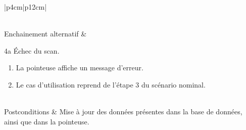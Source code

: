 \begin{longtable}{|p{4cm}|p{12cm}|}
\begin{minipage}[t]{\linewidth}
\begin{enumerate}[itemindent=0pt, leftmargin=*, nosep,before=\vspace{-0.5\baselineskip},after=\vspace{0.2\baselineskip}]
                            \end{enumerate}
                    \end{minipage}
                    \\
                    \hline
                    Enchainement alternatif & 
                    \begin{minipage}[t]{\linewidth}
                            4a Échec du scan.
                            \begin{enumerate}[nosep,after=\strut, leftmargin=*]
                                \item La pointeuse affiche un message d’erreur.
                                \item Le cas d’utilisation reprend de l’étape 3 du scénario nominal.
                            \end{enumerate}
                    \end{minipage}
                    \\
                    
                    \hline
                    Postconditions & Mise à jour des données présentes dans la base de données, ainsi que dans la pointeuse.
                    \\
                    \hline
                    \caption{Description du cas d'utilisation « Ajouter une empreinte »}\\
            \end{longtable}
            
